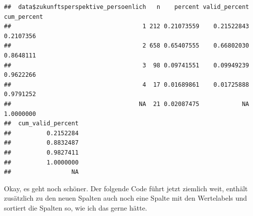 \documentclass[
]{book}
\newenvironment{Shaded}{\begin{snugshade}}{\end{snugshade}}
\newcommand{\AttributeTok}[1]{\textcolor[rgb]{0.77,0.63,0.00}{#1}}
\newcommand{\CommentTok}[1]{\textcolor[rgb]{0.56,0.35,0.01}{\textit{#1}}}
\newcommand{\FunctionTok}[1]{\textcolor[rgb]{0.00,0.00,0.00}{#1}}
\newcommand{\NormalTok}[1]{#1}
\newcommand{\SpecialCharTok}[1]{\textcolor[rgb]{0.00,0.00,0.00}{#1}}
\begin{document}
\begin{Shaded}
\end{Shaded}

\begin{verbatim}
##  data$zukunftsperspektive_persoenlich   n    percent valid_percent cum_percent
##                                     1 212 0.21073559    0.21522843   0.2107356
##                                     2 658 0.65407555    0.66802030   0.8648111
##                                     3  98 0.09741551    0.09949239   0.9622266
##                                     4  17 0.01689861    0.01725888   0.9791252
##                                    NA  21 0.02087475            NA   1.0000000
##  cum_valid_percent
##          0.2152284
##          0.8832487
##          0.9827411
##          1.0000000
##                 NA
\end{verbatim}

Okay, es geht noch schöner. Der folgende Code führt jetzt ziemlich weit, enthält zusätzlich zu den neuen Spalten auch noch eine Spalte mit den Wertelabels und sortiert die Spalten so, wie ich das gerne hätte.
\end{document}
